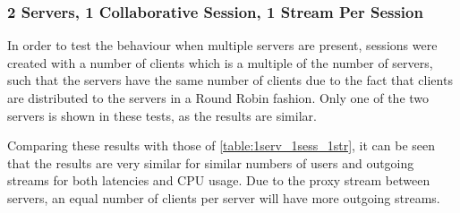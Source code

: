 \clearpage\subsubsection{2 Servers, 1 Collaborative Session, 1 Stream Per Session}

In order to test the behaviour when multiple servers are present, sessions were created with a number of clients which is a multiple of the number of servers, such that the servers have the same number of clients due to the fact that clients are distributed to the servers in a Round Robin fashion. Only one of the two servers is shown in these tests, as the results are similar.

Comparing these results with those of \ref{table:1serv_1sess_1str}, it can be seen that the results are very similar for similar numbers of users and outgoing streams for both latencies and CPU usage. Due to the proxy stream between servers, an equal number of clients per server will have more outgoing streams.

